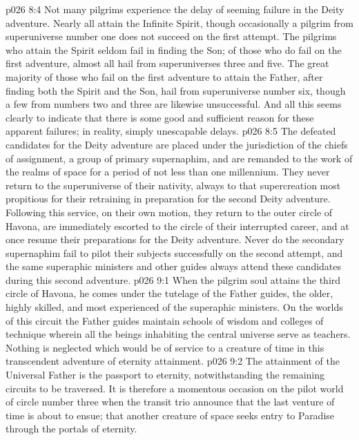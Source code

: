 \vs p026 8:4 \pc Not many pilgrims experience the delay of seeming failure in the Deity adventure. Nearly all attain the Infinite Spirit, though occasionally a pilgrim from superuniverse number one does not succeed on the first attempt. The pilgrims who attain the Spirit seldom fail in finding the Son; of those who do fail on the first adventure, almost all hail from superuniverses three and five. The great majority of those who fail on the first adventure to attain the Father, after finding both the Spirit and the Son, hail from superuniverse number six, though a few from numbers two and three are likewise unsuccessful. And all this seems clearly to indicate that there is some good and sufficient reason for these apparent failures; in reality, simply unescapable delays.
\vs p026 8:5 The defeated candidates for the Deity adventure are placed under the jurisdiction of the chiefs of assignment, a group of primary supernaphim, and are remanded to the work of the realms of space for a period of not less than one millennium. They never return to the superuniverse of their nativity, always to that supercreation most propitious for their retraining in preparation for the second Deity adventure. Following this service, on their own motion, they return to the outer circle of Havona, are immediately escorted to the circle of their interrupted career, and at once resume their preparations for the Deity adventure. Never do the secondary supernaphim fail to pilot their subjects successfully on the second attempt, and the same superaphic ministers and other guides always attend these candidates during this second adventure.
\vs p026 9:1 When the pilgrim soul attains the third circle of Havona, he comes under the tutelage of the Father guides, the older, highly skilled, and most experienced of the superaphic ministers. On the worlds of this circuit the Father guides maintain schools of wisdom and colleges of technique wherein all the beings inhabiting the central universe serve as teachers. Nothing is neglected which would be of service to a creature of time in this transcendent adventure of eternity attainment.
\vs p026 9:2 The attainment of the Universal Father is the passport to eternity, notwithstanding the remaining circuits to be traversed. It is therefore a momentous occasion on the pilot world of circle number three when the transit trio announce that the last venture of time is about to ensue; that another creature of space seeks entry to Paradise through the portals of eternity.
